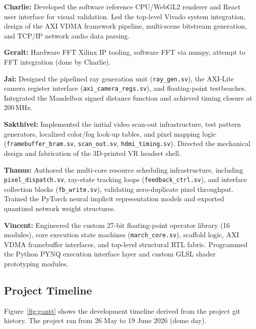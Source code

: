 \noindent\textbf{Charlie: } Developed the software reference CPU/WebGL2 renderer and React user interface for visual validation. Led the top-level Vivado system integration, design of the AXI VDMA framework pipeline, multi-scene bitstream generation, and TCP/IP network audio data parsing.

\noindent\textbf{Geralt: } Hardware FFT Xilinx IP tooling, software FFT via numpy, attempt to FFT integration (done by Charlie).

\noindent\textbf{Jai: } Designed the pipelined ray generation unit (\texttt{ray\_gen.sv}), the AXI-Lite camera register interface (\texttt{axi\_camera\_regs.sv}), and floating-point testbenches. Integrated the Mandelbox signed distance function and achieved timing closure at 200\,MHz.

\noindent\textbf{Sakthivel: } Implemented the initial video scan-out infrastructure, test pattern generators, localized color/fog look-up tables, and pixel mapping logic (\texttt{framebuffer\_bram.sv}, \texttt{scan\_out.sv}, \texttt{hdmi\_timing.sv}). Directed the mechanical design and fabrication of the 3D-printed VR headset shell.

\noindent\textbf{Thanus: } Authored the multi-core resource scheduling infrastructure, including \texttt{pixel\_dispatch.sv}, ray-state tracking loops (\texttt{feedback\_ctrl.sv}), and interface collection blocks (\texttt{fb\_write.sv}), validating zero-duplicate pixel throughput. Trained the PyTorch neural implicit representation models and exported quantized network weight structures.

\noindent\textbf{Vincent: } Engineered the custom 27-bit floating-point operator library (16 modules), core execution state machines (\texttt{march\_core.sv}), scaffold logic, AXI VDMA framebuffer interfaces, and top-level structural RTL fabric. Programmed the Python PYNQ execution interface layer and custom GLSL shader prototyping modules.

\subsection{Project Timeline}

Figure~\ref{fig:gantt} shows the development timeline derived from the project
git history. The project ran from 26 May to 19 June 2026 (demo day).

